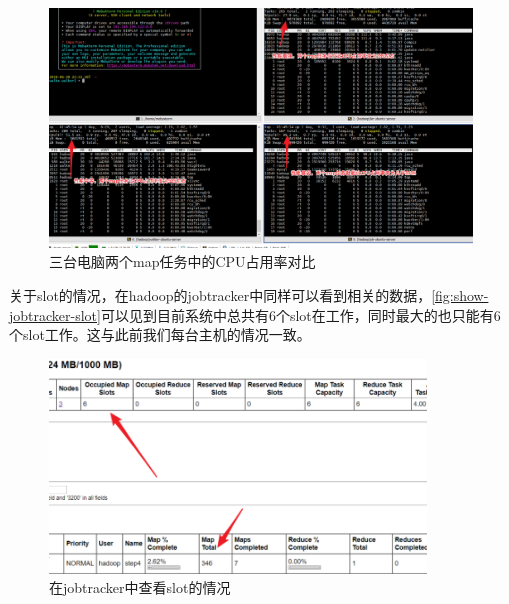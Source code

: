 \documentclass[forprint]{myreport}
\begin{document}
\begin{figure}[htp]
  \centering
  \includegraphics[width=13cm]{"./figure/2018-07-03-15-06-19.png"}
  \caption{三台电脑两个map任务中的CPU占用率对比}
  \label{fig:CPU-diff}
\end{figure}

关于slot的情况，在hadoop的jobtracker中同样可以看到相关的数据，\autoref{fig:show-jobtracker-slot}可以见到目前系统中总共有6个slot在工作，同时最大的也只能有6个slot工作。这与此前我们每台主机的情况一致。

\begin{figure}[htp]
  \centering
  \includegraphics[width=10cm]{"./figure/2018-07-03-15-16-59.png"}
  \caption{在jobtracker中查看slot的情况}
  \label{fig:show-jobtracker-slot}
\end{figure}
\end{document}
